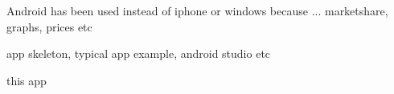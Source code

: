 Android has been used instead of iphone or windows because ... marketshare, graphs, prices etc


app skeleton, typical app example, android studio etc


this app